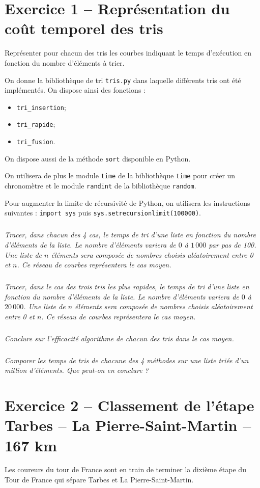 \section*{Exercice 1 -- Représentation du coût temporel des tris}

\begin{obj}
Représenter pour chacun des tris les courbes indiquant le temps d'exécution en fonction du nombre d'éléments à trier.
\end{obj}
On donne la bibliothèque de tri \texttt{tris.py} dans laquelle différents tris ont été implémentés.
On dispose ainsi des fonctions : 
\begin{itemize}
\item \texttt{tri\_insertion};
\item \texttt{tri\_rapide};
\item \texttt{tri\_fusion}.
\end{itemize}
On dispose aussi de la méthode \texttt{sort} disponible en Python.

On utilisera de plus le module \texttt{time} de la bibliothèque \texttt{time} pour créer un chronomètre et le module \texttt{randint} de la bibliothèque \texttt{random}.

Pour augmenter la limite de récursivité de Python, on utilisera les instructions suivantes : \texttt{import sys} puis \texttt{sys.setrecursionlimit(100000)}.

\subparagraph{}
\textit{Tracer, dans chacun des 4 cas, le temps de tri d'une liste en fonction du nombre d'éléments de la liste. Le nombre d'éléments variera de $0$ à $1\, 000$ par pas de 100. Une liste de $n$ éléments sera composée de nombres choisis aléatoirement entre 0 et $n$. Ce réseau de courbes représentera le cas moyen.}

\subparagraph{}
\textit{Tracer, dans le cas des trois tris les plus rapides, le temps de tri d'une liste en fonction du nombre d'éléments de la liste. Le nombre d'éléments variera de $0$ à $20\, 000$. Une liste de $n$ éléments sera composée de nombres choisis aléatoirement entre 0 et $n$. Ce réseau de courbes représentera le cas moyen.}

\subparagraph{}
\textit{Conclure sur l'efficacité algorithme de chacun des tris dans le cas moyen.}

\subparagraph{}
\textit{Comparer les temps de tris de chacune des 4 méthodes sur une liste triée d'un million d'éléments. Que peut-on en conclure ?}




\section*{Exercice 2 -- Classement de l'étape Tarbes -- La Pierre-Saint-Martin -- 167 km}
Les coureurs du tour de France sont en train de terminer la dixième étape du Tour de France qui sépare Tarbes et La 
Pierre-Saint-Martin. 

